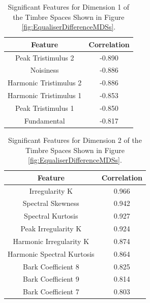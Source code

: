 	\begin{table}[h!]
		\centering
		\begin{tabular}{|c|c|}
			\hline
			\bf{Feature} & \bf{Correlation} \\
			\hline
			\hline
			Peak Tristimulus 2 & -0.890 \\
			\hline
			Noisiness & -0.886 \\
			\hline
			Harmonic Tristimulus 2 & -0.886 \\
			\hline
			Harmonic Tristimulus 1 & -0.853 \\
			\hline
			Peak Tristimulus 1 & -0.850 \\
			\hline
			Fundamental & -0.817 \\
			\hline
		\end{tabular}
		\caption{Significant Features for Dimension 1 of the Timbre Spaces Shown in Figure 
			 \ref{fig:EqualiserDifferenceMDSs}.}
		\label{tab:EqualiserDifferenceFeatures}
	\end{table}

	\begin{table}[h!]
		\centering
		\begin{tabular}{|c|c|}
			\hline
			\bf{Feature} & \bf{Correlation} \\
			\hline
			\hline
			Irregularity K & 0.966 \\
			\hline
			Spectral Skewness & 0.942 \\
			\hline
			Spectral Kurtosis & 0.927 \\
			\hline
			Peak Irregularity K & 0.924 \\
			\hline
			Harmonic Irregularity K & 0.874 \\
			\hline
			Harmonic Spectral Kurtosis & 0.864 \\
			\hline
			Bark Coefficient 8 & 0.825 \\
			\hline
			Bark Coefficient 9 & 0.814 \\
			\hline
			Bark Coefficient 7 & 0.803 \\
			\hline
		\end{tabular}
		\caption{Significant Features for Dimension 2 of the Timbre Spaces Shown in Figure 
			 \ref{fig:EqualiserDifferenceMDSs}.}
		\label{tab:EqualiserDifferenceFeatures}
	\end{table}

